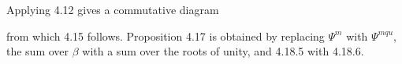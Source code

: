 Applying 4.12 gives a commutative diagram
\begin{center}
\end{center}
from which 4.15 follows.  Proposition 4.17 is obtained by replacing
$\Psi^m$ with $\Psi^{mqu}$, the sum over $\beta$ with a sum over the
roots of unity, and 4.18.5 with 4.18.6.

